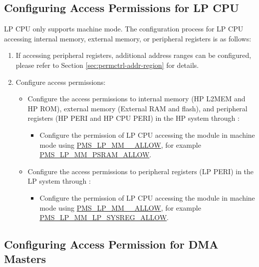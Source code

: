 \documentclass[main\_\_EN.tex]{subfiles}
\begin{document}
\subsection{Configuring Access Permissions for LP CPU}

LP CPU only supports machine mode. The configuration process for LP CPU accessing internal memory, external memory, or peripheral registers is as follows:

\begin{enumerate}
    \item If accessing peripheral registers,  additional address ranges can be configured, please refer to Section \ref{sec:permctrl-addr-region} for details.
    \item Configure access permissions:
    \begin{itemize}
        \item Configure the access permissions to internal memory (HP L2MEM and HP ROM), external memory (External RAM and flash), and peripheral registers (HP PERI and HP CPU PERI) in the HP system through :
        \begin{itemize}
            \item Configure the permission of LP CPU accessing the  module in machine mode using \hyperref[fielddesc:PMSLPMML2ROMALLOW]{PMS\_LP\_MM\_\_ALLOW}, for example \hyperref[fielddesc:PMSLPMMPSRAMALLOW]{PMS\_LP\_MM\_PSRAM\_ALLOW}.
        \end{itemize}
        \item Configure the access permissions to peripheral registers (LP PERI) in the LP system through :
        \begin{itemize}
            \item Configure the permission of LP CPU accessing the  module in machine mode using \hyperref[fielddesc:PMSLPMMLPSYSREGALLOW]{PMS\_LP\_MM\_\_ALLOW}, for example \hyperref[fielddesc:PMSLPMMLPSYSREGALLOW]{PMS\_LP\_MM\_LP\_SYSREG\_ALLOW}.
        \end{itemize}
    \end{itemize}
\end{enumerate}

\subsection{Configuring Access Permission for DMA Masters}
\end{document}
